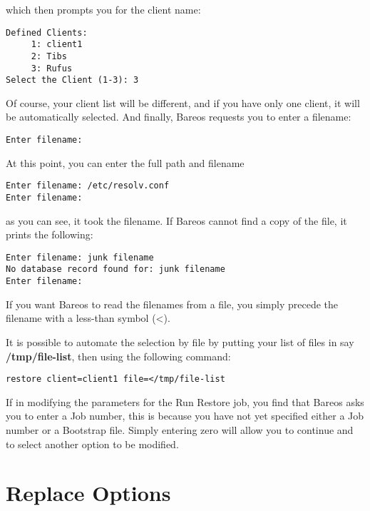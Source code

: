 which then prompts you for the client name:

\footnotesize
\begin{verbatim}
Defined Clients:
     1: client1
     2: Tibs
     3: Rufus
Select the Client (1-3): 3
\end{verbatim}
\normalsize

Of course, your client list will be different, and if you have only one
client, it will be automatically selected. And finally, Bareos requests you to
enter a filename:

\footnotesize
\begin{verbatim}
Enter filename:
\end{verbatim}
\normalsize

At this point, you can enter the full path and filename

\footnotesize
\begin{verbatim}
Enter filename: /etc/resolv.conf
Enter filename:
\end{verbatim}
\normalsize

as you can see, it took the filename. If Bareos cannot find a copy of the
file, it prints the following:

\footnotesize
\begin{verbatim}
Enter filename: junk filename
No database record found for: junk filename
Enter filename:
\end{verbatim}
\normalsize

If you want Bareos to read the filenames from a file, you simply precede the
filename with a less-than symbol ({\textless}).

It is possible to automate the selection by file by putting your list of files
in say {\bf /tmp/file-list}, then using the following command:

\footnotesize
\begin{verbatim}
restore client=client1 file=</tmp/file-list
\end{verbatim}
\normalsize

If in modifying the parameters for the Run Restore job, you find that Bareos
asks you to enter a Job number, this is because you have not yet specified
either a Job number or a Bootstrap file. Simply entering zero will allow you
to continue and to select another option to be modified.

\label{Replace}

\section{Replace Options}

